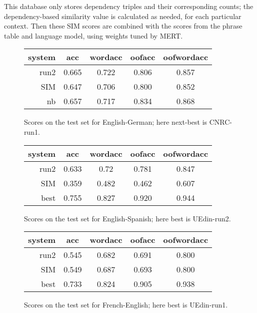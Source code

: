 \documentclass[11pt,a4paper]{article}
\begin{document}
This database only stores dependency triples and their corresponding counts;
the dependency-based similarity value is calculated as needed, for each
particular context. Then these SIM scores are combined with the scores from the
phrase table and language model, using weights tuned by MERT.

\begin{figure}[t]
  \begin{center}
  \begin{tabular}{|r|c|c|c|c|}
    \hline
    system & acc      & wordacc  & oofacc & oofwordacc \\
    \hline
    run2  &  0.665 & 0.722  &  0.806  & 0.857 \\
    SIM    &  0.647 & 0.706 & 0.800 & 0.852 \\
    nb     &  0.657   & 0.717   & 0.834 & 0.868    \\
    \hline
  \end{tabular}
  \end{center}
\caption{Scores on the test set for English-German; here next-best is CNRC-run1.}
\label{fig:theresults-en-de}
\end{figure}

\begin{figure}[t]
  \begin{center}
  \begin{tabular}{|r|c|c|c|c|}
    \hline
    system & acc      & wordacc  & oofacc & oofwordacc \\
    \hline
    run2  &  0.633 & 0.72 & 0.781 & 0.847 \\
    SIM    &  0.359 &  0.482 & 0.462 & 0.607 \\
    best   &  0.755 & 0.827   & 0.920  & 0.944 \\
    \hline
  \end{tabular}
  \end{center}
\caption{Scores on the test set for English-Spanish; here best is UEdin-run2.}
\label{fig:theresults-en-es}
\end{figure}

\begin{figure}[t]
  \begin{center}
  \begin{tabular}{|r|c|c|c|c|}
    \hline
    system & acc      & wordacc  & oofacc & oofwordacc \\
    \hline
    run2  & 0.545  & 0.682 & 0.691 & 0.800 \\
    SIM        &  0.549 & 0.687 & 0.693 & 0.800 \\
    best & 0.733 & 0.824 & 0.905 & 0.938 \\
    \hline
  \end{tabular}
  \end{center}
\caption{Scores on the test set for French-English; here best is UEdin-run1.}
\label{fig:theresults-fr-en}
\end{figure}
\end{document}
